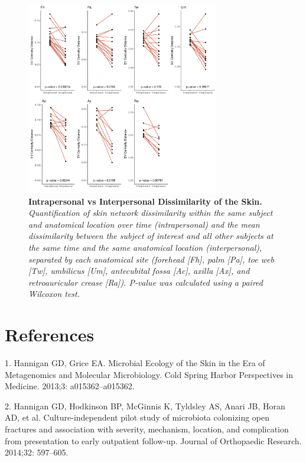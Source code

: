 \documentclass[12pt,]{article}
\begin{document}
\newpage

\begin{figure}[htbp]
\centering
\includegraphics[width=0.75000\textwidth]{../figures/intraallskin.pdf}
\caption{\textbf{Intrapersonal vs Interpersonal Dissimilarity of the
Skin.} \emph{Quantification of skin network dissimilarity within the
same subject and anatomical location over time (intrapersonal) and the
mean dissimilarity between the subject of interest and all other
subjects at the same time and the same anatomical location
(interpersonal), separated by each anatomical site (forehead {[}Fh{]},
palm {[}Pa{]}, toe web {[}Tw{]}, umbilicus {[}Um{]}, antecubital fossa
{[}Ac{]}, axilla {[}Ax{]}, and retroauricular crease {[}Ra{]}). P-value
was calculated using a paired Wilcoxon test.}\label{allskin}}
\end{figure}

\newpage

\section*{References}\label{references}

\hypertarget{refs}{}
\hypertarget{ref-Hannigan:2013im}{}
1. Hannigan GD, Grice EA. Microbial Ecology of the Skin in the Era of
Metagenomics and Molecular Microbiology. Cold Spring Harbor Perspectives
in Medicine. 2013;3: a015362--a015362.

\hypertarget{ref-Hannigan:2014be}{}
2. Hannigan GD, Hodkinson BP, McGinnis K, Tyldsley AS, Anari JB, Horan
AD, et al. Culture-independent pilot study of microbiota colonizing open
fractures and association with severity, mechanism, location, and
complication from presentation to early outpatient follow-up. Journal of
Orthopaedic Research. 2014;32: 597--605.
\end{document}
